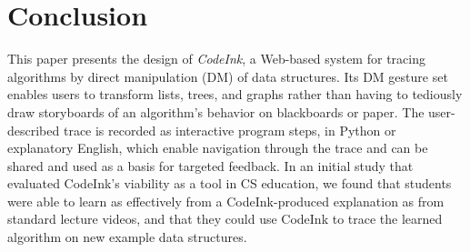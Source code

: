 \section{Conclusion}

This paper presents the design of \emph{CodeInk}, a Web-based system for
tracing algorithms by direct manipulation (DM) of data structures. Its
DM gesture set enables users to transform lists, trees, and graphs
rather than having to tediously draw storyboards of an algorithm's
behavior on blackboards or paper. The user-described trace is recorded
as interactive program steps, in Python or explanatory English, which
enable navigation through the trace and can be shared and used as a
basis for targeted feedback. In an initial study that evaluated
CodeInk's viability as a tool in CS education, we found that students
were able to learn as effectively from a CodeInk-produced explanation as
from standard lecture videos, and that they could use CodeInk to trace
the learned algorithm on new example data structures.


